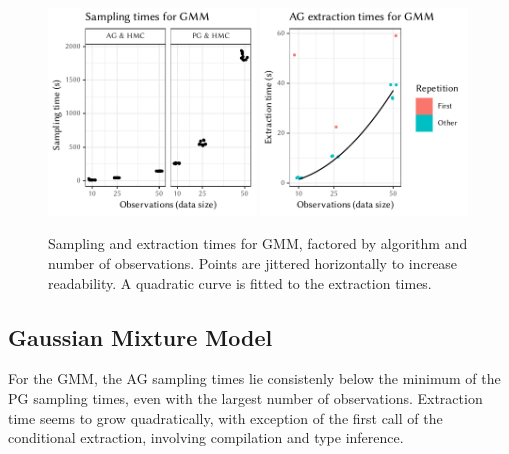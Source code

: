 \newcommand{\leftplotcaption}[1]{%
  Sampling and extraction times for #1, factored by algorithm and number of observations.  Points
  are jittered horizontally to increase readability.  A quadratic curve is fitted to the extraction
  times.  } \newcommand{\rightplotcaption}[1]{%
  Diagnostics, factored by algorithm, number of observations, and a selection of model parameters.
  \(\widehat{\mathrm{R}}\) and ESS point estimates are jittered horizontally for better readability.
  A horizontal line marks the reference value of \(1.1\) in the \(\widehat{\mathrm{R}}\) plot.  For
  chain plots and autocorrelation, the third chain of the respective combination has been used.  }

\begin{figure}[t!]
  \centering
  \includegraphics[width=0.49\textwidth]{figures/GMM-sampling_times}
  \includegraphics[width=0.49\textwidth]{figures/GMM-compile_times}
  \caption{\leftplotcaption{GMM}}
  \label{fig:plots-gmm}
\end{figure}

\subsection*{Gaussian Mixture Model}

For the GMM, the AG sampling times lie consistenly below the minimum of the PG sampling times, even
with the largest number of observations.  Extraction time seems to grow quadratically, with
exception of the first call of the conditional extraction, involving compilation and type
inference.

